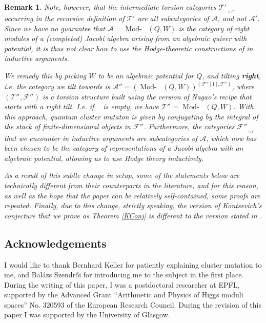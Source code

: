 \documentclass[a4paper,10pt]{amsart}
\newtheorem{remark}[theorem]{Remark}
\DeclareMathOperator{\Tmod}{Mod-}
\newcommand{\Rmod}[1]{\Tmod\!#1}
\DeclareMathOperator{\HJac}{\widehat{Jac}}
\DeclareMathOperator{\Ss}{\overline{s}}
\begin{document}
\begin{remark}
Note, however, that the intermediate torsion categories $\mathcal{T}'_{\Ss_{\leq t'}}$ occurring in the recursive definition of $\mathcal{T}'_{\Ss}$ are all subcategories of $\mathcal{A}$, and not $\mathcal{A}'$.  Since we have no guarantee that $\mathcal{A}=\Rmod{\HJac(Q,W)}$ is the category of right modules of a (completed) Jacobi algebra arising from an algebraic quiver with potential, it is thus not clear how to use the Hodge-theoretic constructions of \cite{COHA} in inductive arguments.  

We remedy this by \textit{picking} $W$ to be an algebraic potential for $Q$, and tilting \textbf{right}, i.e. the category we tilt towards is $\mathcal{A}''=(\Rmod{\HJac(Q,W)})^{(\mathcal{F}''_{\Ss}[1],\mathcal{T}''_{\Ss})}$, where $(\mathcal{T}''_{\Ss},\mathcal{F}''_{\Ss})$ is a torsion structure built using the version of Nagao's recipe that starts with a \textit{right} tilt.  I.e. if $\Ss$ is empty, we have $\mathcal{T}''_{\Ss}=\Rmod{\HJac(Q,W)}$.  With this approach, quantum cluster mutaton is given by conjugating by the integral of the stack of finite-dimensional objects in $\mathcal{F}''_{\Ss}$.  Furthermore, the categories $\mathcal{F}''_{\Ss_{\leq t'}}$ that we encounter in inductive arguments are subcategories of $\mathcal{A}$, which now has been chosen to be the category of representations of a Jacobi algebra with an algebraic potential, allowing us to use Hodge theory inductively.  

As a result of this subtle change in setup, some of the statements below are technically different from their counterparts in the literature, and for this reason, as well as the hope that the paper can be relatively self-contained, some proofs are repeated.  Finally, due to this change, strictly speaking, the version of Kontsevich's conjecture that we prove as Theorem \ref{KConj} is different to the version stated in \cite{Efi11}.
\end{remark}
\subsection{Acknowledgements}
I would like to thank Bernhard Keller for patiently explaining cluster mutation to me, and Bal\'azs Szendr\H{o}i for introducing me to the subject in the first place.  During the writing of this paper, I was a postdoctoral researcher at EPFL, supported by the Advanced Grant ``Arithmetic and Physics of Higgs moduli spaces'' No. 320593 of the European Research Council.  During the revision of this paper I was supported by the University of Glasgow.
\end{document}
